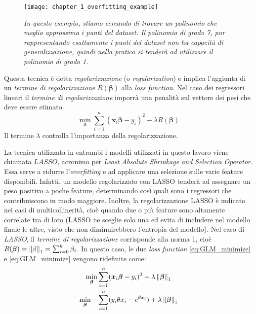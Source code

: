 \begin{figure}[!ht]
\centering
\texttt{[image: chapter\_1\_overfitting\_example]}
\caption{\textit{In questo esempio, stiamo cercando di trovare un polinomio che meglio approssima i punti del dataset. Il polinomio di grado 7, pur rappresentando esattamente i punti del dataset non ha capacità di generalizzazione, quindi nella pratica si tenderà ad utilizzare il polinomio di grado 1.}}
\label{fig:ch_1_overfitting}
\end{figure}

Questa tecnica è detta \textit{regolarizzazione} (o \textit{regularization}) e implica l'aggiunta di un \textit{termine di 
regolarizzazione} $R(\bm{\beta})$ alla \textit{loss function}. Nel caso dei regressori lineari il \textit{termine di 
regolarizzazione} imporrà una penalità sul vettore dei pesi che deve essere stimato.
\begin{equation}
\min_{\bm{\beta}} \sum_{i=1}^{n} (\bm{x}_i\bm{\beta} - y_i)^2 - \lambda R(\bm{\beta})
\end{equation}
Il termine $\lambda$ controlla l'importanza della regolarizzazione.
\bigskip

La tecnica utilizzata in entrambi i modelli utilizzati in questo lavoro viene chiamata $\textit{LASSO}$, acronimo per 
\textit{Least Absolute Shrinkage and Selection Operator}. Essa serve a ridurre l'\textit{overfitting} e ad applicare 
una selezione sulle varie feature disponibili. Infatti, un modello regolarizzato con LASSO tenderà ad assegnare un peso 
positivo a poche feature, determinando così quali sono i regressori che contribuiscono in modo maggiore. Inoltre, la 
regolarizzazione LASSO è indicato nei casi di multicollinerità, cioè quando due o più feature sono altamente correlate tra di 
loro (LASSO ne sceglie solo una ed evita di includere nel modello finale le altre, visto che non diminuirebbero l'entropia 
del modello). Nel caso di \textit{LASSO}, il \textit{termine di regolarizzazione} corrisponde alla norma 1, cioè 
$R(\bm{\beta}) = \left\lVert\bf{\beta}\right\rVert_1 = \sum_{i=0}^k \beta_i$. 
In questo caso, le due \textit{loss function} \eqref{eq:GLM_minimize} e 
\eqref{eq:GLM_minimize} vengono ridefinite come:
\begin{gather}
\min_{\bm{\beta}} \sum_{i=1}^{n} (\bm{x}_i\bm{\beta} - y_i)^2 + \lambda\left\lVert\bm{\beta}\right\rVert_1 \label{eq:OLS_LASSO} \\
\min_{\bm{\beta}} -\sum_{i=1}^n (y_i\theta x_i - e^{\theta x_i} )  + \lambda\left\lVert\bm{\beta}\right\rVert_1 \label{eq:GLM_LASSO}
\end{gather}  

